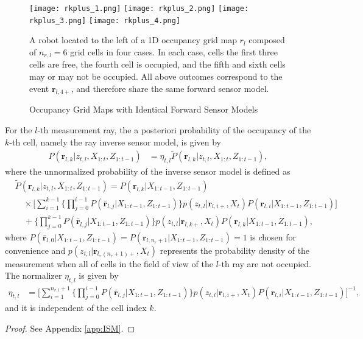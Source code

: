 \begin{figure}
  \centering
  \texttt{[image: rkplus\_1.png]}
    \centering
  \texttt{[image: rkplus\_2.png]}  
  \centering
  \texttt{[image: rkplus\_3.png]}
    \centering
  \texttt{[image: rkplus\_4.png]}
  \caption{Occupancy Grid Maps with Identical Forward Sensor Models}
  \medskip
  \small
  A robot located to the left of a 1D occupancy grid map $r_l$ composed of $n_{r,l}=6$ grid cells in four cases. In each case, cells the first three cells are free, the fourth cell is occupied, and the fifth and sixth cells may or may not be occupied. All above outcomes correspond to the event $\mathbf{r}_{l,4+}$, and therefore share the same forward sensor model.
  \label{fig:show_rkplus}
\end{figure}

\begin{prop}
\label{prop:ISM}
For the $l$-th measurement ray, the a posteriori probability of the occupancy of the $k$-th cell, namely the ray inverse sensor model, is given by
\begin{align}
\label{eqn:RayISMAnswer}
P(\mathbf{r}_{l,k}|z_{t,l},X_{1:t},Z_{1:t-1})&=\eta_{t,l}\tilde P(\mathbf{r}_{l,k}|z_{t,l},X_{1:t},Z_{1:t-1}),
\end{align}
where the unnormalized probability of the inverse sensor model is defined as
\begin{align}
\label{eqn:Unnormalized}
& \tilde P(\mathbf{r}_{l,k}|z_{t,l},X_{1:t},Z_{1:t-1})%
=P(\mathbf{r}_{l,k}|X_{1:t-1},Z_{1:t-1})\nonumber\\
&\quad\times 
\bigg[\sum_{i=1}^{k-1}\bigg\{\prod_{j=0}^{i-1}P(\bar{\mathbf{r}}_{l,j}|X_{1:t-1},Z_{1:t-1})\bigg\}%
p(z_{t,l}|\mathbf{r}_{l,i+},X_t)P(\mathbf{r}_{l,i}|X_{1:t-1},Z_{1:t-1})\bigg]\nonumber\\
&\quad + \bigg\{\prod_{j=0}^{k-1}P(\bar{\mathbf{r}}_{l,j}|X_{1:t-1},Z_{1:t-1})\bigg\}%
p(z_{t,l}|\mathbf{r}_{l,k+},X_t)P(\mathbf{r}_{l,k}|X_{1:t-1},Z_{1:t-1}),
\end{align}
where $P(\bar{\mathbf{r}}_{l,0}|X_{1:t-1},Z_{1:t-1})=P(\mathbf{r}_{l,n_r+1}|X_{1:t-1},Z_{1:t-1})=1$ is chosen for convenience and $p(z_{t,l}|\mathbf{r}_{l,(n_r+1)+},X_t)$ represents the probability density of the measurement when all of cells in the field of view of the $l$-th ray are not occupied. The normalizer $\eta_{t,l}$ is given by
\begin{align}
\label{eqn:allEta}
\eta_{t,l}
&=
\bigg[\sum_{i=1}^{n_{r,l}+1}\bigg\{\prod_{j=0}^{i-1}P(\bar{\mathbf{r}}_{l,j}|X_{1:t-1},Z_{1:t-1})\bigg\}p(z_{t,l}|\mathbf{r}_{l,i+},X_t)P(\mathbf{r}_{l,i}|X_{1:t-1},Z_{1:t-1})\bigg]^{-1},
\end{align}
and it is independent of the cell index $k$.
\end{prop}
\begin{proof}
See Appendix \ref{app:ISM}.
\end{proof}


